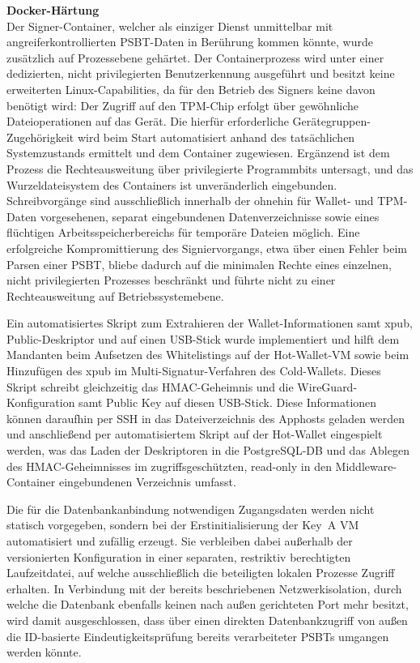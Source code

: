 \textbf{Docker-Härtung} \\
Der Signer-Container, welcher als einziger Dienst unmittelbar mit angreiferkontrollierten \ac{PSBT}-Daten in Berührung kommen könnte, wurde zusätzlich auf Prozessebene gehärtet. Der Containerprozess wird unter einer dedizierten, nicht privilegierten Benutzerkennung ausgeführt und besitzt keine erweiterten Linux-Capabilities, da für den Betrieb des Signers keine davon benötigt wird: Der Zugriff auf den \ac{TPM}-Chip erfolgt über gewöhnliche Dateioperationen auf das Gerät. Die hierfür erforderliche Gerätegruppen-Zugehörigkeit wird beim Start automatisiert anhand des tatsächlichen Systemzustands ermittelt und dem Container zugewiesen. Ergänzend ist dem Prozess die Rechteausweitung über privilegierte Programmbits untersagt, und das Wurzeldateisystem des Containers ist unveränderlich eingebunden. Schreibvorgänge sind ausschließlich innerhalb der ohnehin für Wallet- und \ac{TPM}-Daten vorgesehenen, separat eingebundenen Datenverzeichnisse sowie eines flüchtigen Arbeitsspeicherbereichs für temporäre Dateien möglich. Eine erfolgreiche Kompromittierung des Signiervorgangs, etwa über einen Fehler beim Parsen einer \ac{PSBT}, bliebe dadurch auf die minimalen Rechte eines einzelnen, nicht privilegierten Prozesses beschränkt und führte nicht zu einer Rechteausweitung auf Betriebssystemebene.

Ein automatisiertes Skript  zum Extrahieren der Wallet-Informationen samt \ac{xpub}, Public-Deskriptor und  auf einen \ac{USB}-Stick wurde implementiert und hilft dem Mandanten beim Aufsetzen des Whitelistings auf der Hot-Wallet-\ac{VM} sowie beim Hinzufügen des \ac{xpub} im Multi-Signatur-Verfahren des Cold-Wallets.
Dieses Skript schreibt gleichzeitig das \ac{HMAC}-Geheimnis und die WireGuard-Konfiguration samt Public Key auf diesen \ac{USB}-Stick. 
Diese Informationen können daraufhin per \ac{SSH} in das Dateiverzeichnis des Apphosts geladen werden und anschließend per automatisiertem Skript auf der Hot-Wallet eingespielt werden, was das Laden der Deskriptoren in die PostgreSQL-\ac{DB} und das Ablegen des \ac{HMAC}-Geheimnisses im zugriffsgeschützten, read-only in den Middleware-Container eingebundenen Verzeichnis  umfasst.

Die für die Datenbankanbindung notwendigen Zugangsdaten werden nicht statisch vorgegeben, sondern bei der Erstinitialisierung der Key~A \ac{VM} automatisiert und zufällig erzeugt. Sie verbleiben dabei außerhalb der versionierten Konfiguration in einer separaten, restriktiv berechtigten Laufzeitdatei, auf welche ausschließlich die beteiligten lokalen Prozesse Zugriff erhalten. In Verbindung mit der bereits beschriebenen Netzwerkisolation, durch welche die Datenbank ebenfalls keinen nach außen gerichteten Port mehr besitzt, wird damit ausgeschlossen, dass über einen direkten Datenbankzugriff von außen die \ac{ID}-basierte Eindeutigkeitsprüfung bereits verarbeiteter \acp{PSBT} umgangen werden könnte.

